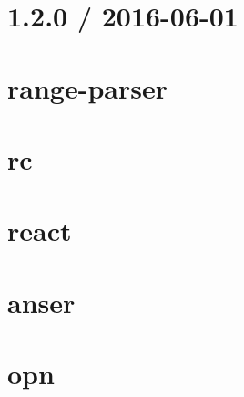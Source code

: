 \documentclass[twoside]{book}
\newcommand{\+}{\discretionary{\mbox{\scriptsize$\hookleftarrow$}}{}{}}
\begin{document}
\chapter{1.2.0 / 2016-\/06-\/01}
\label{md__c_1_workspace_demo_src_main_script_node_modules_range-parser__h_i_s_t_o_r_y}

\chapter{range-\/parser}
\label{md__c_1_workspace_demo_src_main_script_node_modules_range-parser__r_e_a_d_m_e}

\chapter{rc}
\label{md__c_1_workspace_demo_src_main_script_node_modules_rc__r_e_a_d_m_e}

\chapter{react}
\label{md__c_1_workspace_demo_src_main_script_node_modules_react__r_e_a_d_m_e}

\chapter{anser}
\label{md__c_1_workspace_demo_src_main_script_node_modules_react-dev-utils_node_modules_anser__r_e_a_d_m_e}

\chapter{opn}
\label{md__c_1_workspace_demo_src_main_script_node_modules_react-dev-utils_node_modules_opn_readme}

\end{document}
